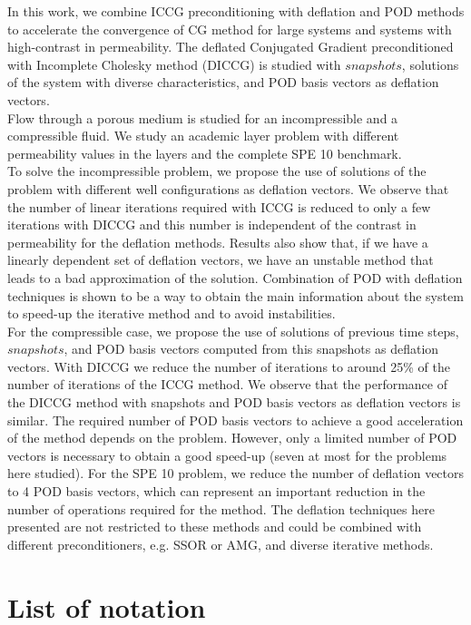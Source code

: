 \documentclass[12pt]{article}
\numberwithin{equation}{section}
\begin{document}
In this work, we combine ICCG preconditioning with deflation and POD methods to accelerate the 
convergence of CG method for large systems and systems with high-contrast in permeability. 
The deflated Conjugated Gradient preconditioned with Incomplete Cholesky method (DICCG) is studied 
with $snapshots$, solutions of the system with diverse characteristics, and POD basis vectors as 
deflation vectors. \\
Flow through a porous medium is studied for an incompressible and a compressible fluid. We study an 
academic layer problem with different permeability values in the layers and the complete SPE 10 
benchmark.\\
To solve the incompressible problem, we propose the use of solutions of the problem with different 
well configurations as deflation vectors. We observe that the number of linear iterations required with ICCG is reduced to only a few iterations with DICCG and this number is independent of the contrast in permeability for the deflation methods. Results also show that, if we have a linearly dependent set of deflation vectors, we have an unstable method that leads to a bad approximation of the solution. Combination of POD with deflation techniques is shown to be a way to obtain the main information about the system to speed-up the iterative method and to avoid instabilities.\\
For the compressible case, we propose the use of solutions of previous time steps, $snapshots$, 
and POD basis vectors computed from this snapshots as deflation vectors. 
With DICCG we reduce the number of iterations to around 25\% of 
the number of iterations of the ICCG method. We observe that the performance of the 
DICCG method with snapshots and POD basis vectors as deflation vectors is similar. The required 
number of POD basis vectors to achieve a good acceleration of the method depends on the problem. 
However, only a limited number of POD vectors is necessary to obtain a good speed-up 
(seven at most for the problems here studied). For the SPE 10 problem, we reduce the number of 
deflation vectors to 4 POD basis vectors, which can represent an important reduction in the number 
of operations required for the method. 
The deflation techniques here presented are not restricted to these methods and could be 
combined with different preconditioners, e.g. SSOR or AMG, and diverse iterative methods.
 
 \newpage
 
% 
\newpage
\newpage
\appendix
\section{List of notation}\label{a1}
\end{document}
